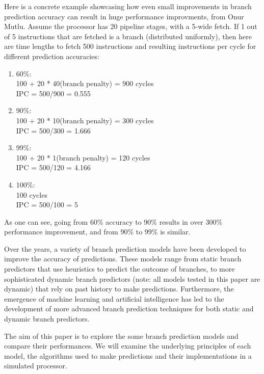 \documentclass[conference]{IEEEtran}
\begin{document}
Here is a concrete example showcasing how even small improvements in branch prediction accuracy can result in huge performance improvments, from Onur Mutlu\cite{mutlu2023}. Assume the processor has 20 pipeline stages, with a 5-wide fetch. If 1 out of 5 instructions that are fetched is a branch (distributed uniformly), then here are time lengths to fetch 500 instructions and resulting instructions per cycle for different prediction accuracies:
\begin{enumerate}
    \item 60\%:\\
    100 + 20 * 40(branch penalty) = 900 cycles\\
    IPC = 500/900 = 0.555\\
    \item 90\%:\\
    100 + 20 * 10(branch penalty) = 300 cycles\\
    IPC = 500/300 = 1.666\\
    \item 99\%:\\
    100 + 20 * 1(branch penalty) = 120 cycles\\
    IPC = 500/120 = 4.166\\
    \item 100\%:\\
    100 cycles\\
    IPC = 500/100 = 5\\
\end{enumerate}
As one can see, going from 60\% accuracy to 90\% results in over 300\% performance improvement, and from 90\% to 99\% is similar.


Over the years, a variety of branch prediction models have been developed to improve the accuracy of predictions. These models range from static branch predictors that use heuristics to predict the outcome of branches, to more sophisticated dynamic branch predictors (note: all models tested in this paper are dynamic) that rely on past history to make predictions. Furthermore, the emergence of  machine learning and artificial intelligence has led to the development of more advanced branch prediction techniques for both static and dynamic branch predictors.

The aim of this paper is to explore the some branch prediction models and compare their performances. We will examine the underlying principles of each model, the algorithms used to make predictions and their implementations in a simulated processor.
\end{document}

